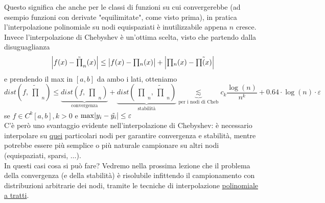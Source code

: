 \documentclass[12pt]{article}
\DeclarePairedDelimiter{\abs}{\lvert}{\rvert}
\newcommand{\inter}{\begin{matrix}\prod\end{matrix}}
\begin{document}
Questo significa che anche per le classi di funzioni su cui convergerebbe (ad esempio funzioni con derivate "equilimitate", come visto prima), in pratica l'interpolazione polinomiale su nodi equispaziati è inutilizzabile appena $n$ cresce.\\
Invece l'interpolazione di Chebyshev è un'ottima scelta, visto che partendo dalla disuguaglianza
\[ \abs*{f(x) - \tilde{\inter}_n (x)} \leq \abs*{f(x) - \inter_n (x)} + \abs*{\inter_n (x) - \tilde{\inter (x)}} \]
e prendendo il max in $[a,b]$ da ambo i lati, otteniamo
\[ dist\left(f, \tilde{\inter}_n\right) \leq \underbrace{dist \left(f, \inter_n \right)}_{\text{convergenza}} + \underbrace{dist \left( \inter_n, \tilde{\inter}_n\right)}_{\text{stabilità}} \underbrace{\lesssim}_{\text{per i nodi di Cheb}} c_k \frac{\log(n)}{n^k} + 0.64\cdot \log(n) \cdot \varepsilon \]
se $f \in C^k [a,b], k>0$ e $\max\abs{y_i - \tilde{y_i}} \leq \varepsilon$\\
C'è però uno svantaggio evidente nell'interpolazione di Chebyshev: è necessario interpolare su \underline{quei} particolari nodi per garantire convergenza e stabilità, mentre potrebbe essere più semplice o più naturale campionare su altri nodi (equispaziati, sparsi, $\dotso$).\\
In questi casi cosa si può fare? Vedremo nella prossima lezione che il problema della convergenza (e della stabilità) è risolubile infittendo il campionamento con distribuzioni arbitrarie dei nodi, tramite le tecniche di interpolazione \underline{polinomiale a tratti}.
\end{document}
